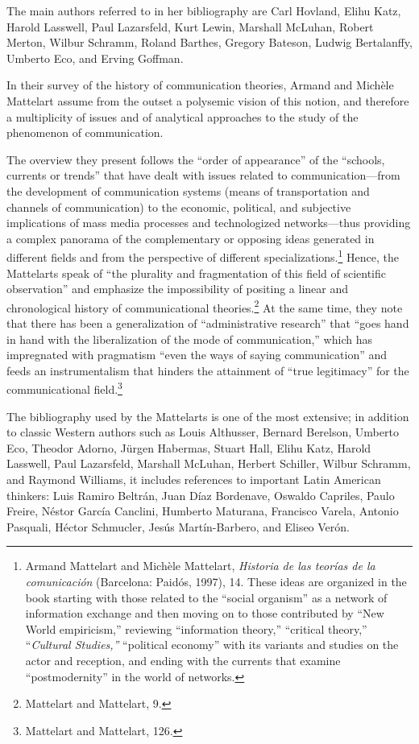 \documentclass{tufte-handout}
\begin{document}
The main authors referred to in her bibliography are Carl Hovland, Elihu
Katz, Harold Lasswell, Paul Lazarsfeld, Kurt Lewin, Marshall McLuhan,
Robert Merton, Wilbur Schramm, Roland Barthes, Gregory Bateson, Ludwig
Bertalanffy, Umberto Eco, and Erving Goffman.

In their survey of the history of communication theories, Armand and
Michèle Mattelart assume from the outset a polysemic vision of this
notion, and therefore a multiplicity of issues and of analytical
approaches to the study of the phenomenon of communication.

The overview they present follows the ``order of appearance'' of the
``schools, currents or trends'' that have dealt with issues related to
communication---from the development of communication systems (means of
transportation and channels of communication) to the economic,
political, and subjective implications of mass media processes and
technologized networks---thus providing a complex panorama of the
complementary or opposing ideas generated in different fields and from
the perspective of different specializations.\footnote{Armand Mattelart
  and Michèle Mattelart, \emph{Historia de las teorías de la
  comunicación} (Barcelona: Paidós, 1997), 14. These ideas are organized
  in the book starting with those related to the ``social organism'' as
  a network of information exchange and then moving on to those
  contributed by ``New World empiricism,'' reviewing ``information
  theory,'' ``critical theory,'' ``\emph{Cultural Studies,''}
  ``political economy'' with its variants and studies on the actor and
  reception, and ending with the currents that examine ``postmodernity''
  in the world of networks.} Hence, the Mattelarts speak of ``the
plurality and fragmentation of this field of scientific observation''
and emphasize the impossibility of positing a linear and chronological
history of communicational theories.\footnote{Mattelart and Mattelart,
  9.} At the same time, they note that there has been a generalization
of ``administrative research'' that ``goes hand in hand with the
liberalization of the mode of communication,'' which has impregnated
with pragmatism ``even the ways of saying communication'' and feeds an
instrumentalism that hinders the attainment of ``true legitimacy'' for
the communicational field.\footnote{Mattelart and Mattelart, 126.}

The bibliography used by the Mattelarts is one of the most extensive; in
addition to classic Western authors such as Louis Althusser, Bernard
Berelson, Umberto Eco, Theodor Adorno, Jürgen Habermas, Stuart Hall,
Elihu Katz, Harold Lasswell, Paul Lazarsfeld, Marshall McLuhan, Herbert
Schiller, Wilbur Schramm, and Raymond Williams, it includes references
to important Latin American thinkers: Luis Ramiro Beltrán, Juan Díaz
Bordenave, Oswaldo Capriles, Paulo Freire, Néstor García Canclini,
Humberto Maturana, Francisco Varela, Antonio Pasquali, Héctor Schmucler,
Jesús Martín-Barbero, and Eliseo Verón.
\end{document}
